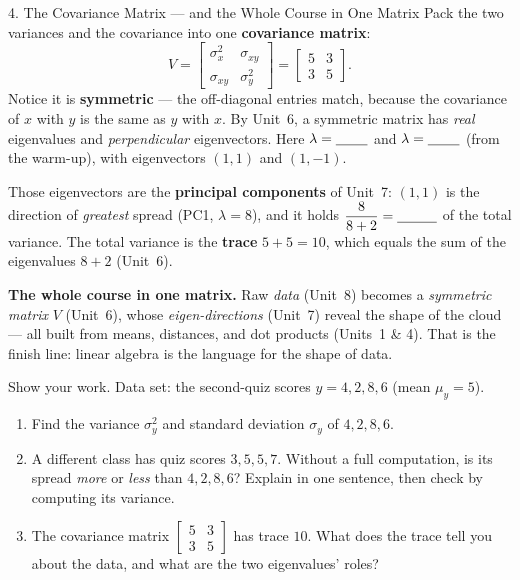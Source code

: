\documentclass[10pt]{article}
\begin{document}
\begin{notesbox}{4. The Covariance Matrix --- and the Whole Course in One Matrix}
Pack the two variances and the covariance into one \textbf{covariance matrix}:
\[
  V=\begin{bmatrix} \sigma_x^2 & \sigma_{xy}\\[2pt] \sigma_{xy} & \sigma_y^2 \end{bmatrix}
   =\begin{bmatrix} 5 & 3\\ 3 & 5 \end{bmatrix}.
\]
Notice it is \textbf{symmetric} --- the off-diagonal entries match, because the covariance of $x$ with $y$ is
the same as $y$ with $x$. By Unit~6, a symmetric matrix has \emph{real} eigenvalues and \emph{perpendicular}
eigenvectors. Here $\lambda=\blank{0.8cm}$ and $\lambda=\blank{0.8cm}$ (from the warm-up), with eigenvectors
$(1,1)$ and $(1,-1)$.

\smallskip
Those eigenvectors are the \textbf{principal components} of Unit~7: $(1,1)$ is the direction of \emph{greatest}
spread (PC1, $\lambda=8$), and it holds $\dfrac{8}{8+2}=\blank{1.0cm}$ of the total variance. The total variance
is the \textbf{trace} $5+5=10$, which equals the sum of the eigenvalues $8+2$ (Unit~6).

\smallskip
\textbf{The whole course in one matrix.} Raw \emph{data} (Unit~8) becomes a \emph{symmetric matrix} $V$
(Unit~6), whose \emph{eigen-directions} (Unit~7) reveal the shape of the cloud --- all built from means,
distances, and dot products (Units~1 \& 4). That is the finish line: linear algebra is the language for the
shape of data.
\end{notesbox}

\begin{practicebox}
Show your work. Data set: the second-quiz scores $y=4,2,8,6$ (mean $\mu_y=5$).
\begin{enumerate}[leftmargin=1.6em, itemsep=4pt]
  \item Find the variance $\sigma_y^2$ and standard deviation $\sigma_y$ of $4,2,8,6$. \writeline
  \item A different class has quiz scores $3,5,5,7$. Without a full computation, is its spread \emph{more} or \emph{less} than $4,2,8,6$? Explain in one sentence, then check by computing its variance. \writeline
  \item The covariance matrix $\left[\begin{smallmatrix}5&3\\3&5\end{smallmatrix}\right]$ has trace $10$. What does the trace tell you about the data, and what are the two eigenvalues' roles? \writeline
\end{enumerate}
\end{practicebox}
\end{document}
